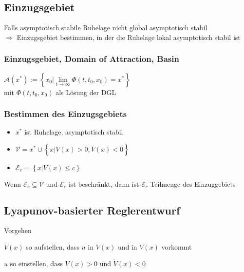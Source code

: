 \documentclass[german]{latex4ei/latex4ei_sheet}
\begin{document}
\begin{sectionbox}
\subsection{Einzugsgebiet}
Falls asymptotisch stabile Ruhelage nicht global asymptotisch stabil \\
$\Rightarrow$ Einzugsgebiet bestimmen, in der die Ruhelage lokal asymptotisch stabil ist

\subsubsection{Einzugsgebiet, Domain of Attraction, Basin}
$\mathcal{A}(x^*) := \left\{ x_0 | \lim\limits_{t \rightarrow \infty} \Phi(t,t_0,x_0) = x^* \right\}$ \\
mit $\Phi(t,t_0,x_0)$ als Lösung der DGL

\subsubsection{Bestimmen des Einzugsgebiets}
\begin{itemize}
  \item $x^*$ ist Ruhelage, asymptotisch stabil
  \item $\mathcal{V} = {x^*} \cup \left\{ x | V(x) > 0, \dot{V}(x) < 0 \right\}$
  \item $\mathcal{E}_c = \left\{ x | V(x) \leq c \right\}$
\end{itemize}
Wenn $\mathcal{E}_c \subseteq \mathcal{V}$ und $\mathcal{E}_c$ ist beschränkt, dann ist $\mathcal{E}_c$ Teilmenge des Einzuggebiets

\subsection{Lyapunov-basierter Reglerentwurf}
\begin{cookbox}{Vorgehen}
  \item $V(x)$ so aufstellen, dass $u$ in $V(x)$ und in $\dot{V}(x)$ vorkommt
  \item $u$ so einstellen, dass $V(x) > 0$ und $\dot{V}(x) < 0$
\end{cookbox}
\end{sectionbox}
\end{document}

